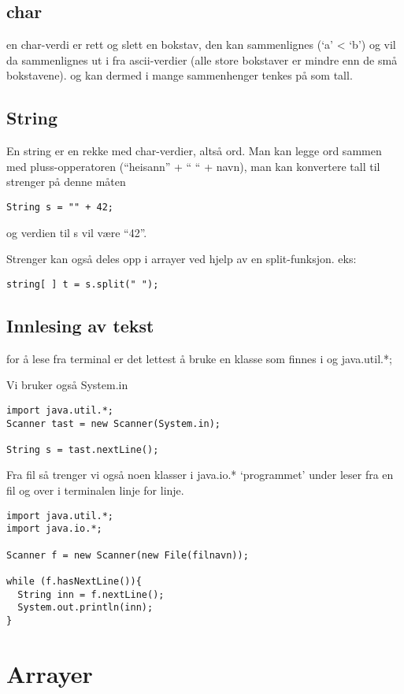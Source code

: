 \documentclass[11pt]{article}
\begin{document}
\subsection{char}
\label{sec-3_1}


   en char-verdi er rett og slett en bokstav, den kan sammenlignes (`a' < `b') 
   og vil da sammenlignes ut
   i fra ascii-verdier (alle store bokstaver er mindre enn de små bokstavene).
   og kan dermed i mange sammenhenger tenkes på som tall.
\subsection{String}
\label{sec-3_2}


   En string er en rekke med char-verdier, altså ord. Man kan legge ord
   sammen med pluss-opperatoren 
   (``heisann'' + `` `` + navn), man kan konvertere tall til strenger på denne måten
\begin{verbatim}
String s = "" + 42;
\end{verbatim}
   og verdien til s vil være ``42''.

   Strenger kan også deles opp i arrayer ved hjelp av en split-funksjon. eks:
\begin{verbatim}
string[ ] t = s.split(" ");
\end{verbatim}
\subsection{Innlesing av tekst}
\label{sec-3_3}

for å lese fra terminal er det lettest å bruke en klasse som
finnes i og java.util.*;

Vi bruker også System.in

\begin{verbatim}
import java.util.*;
Scanner tast = new Scanner(System.in);

String s = tast.nextLine();
\end{verbatim}

Fra fil så trenger vi også noen klasser i java.io.*
`programmet' under leser fra en fil og over i terminalen linje for linje.

\begin{verbatim}
import java.util.*;
import java.io.*;

Scanner f = new Scanner(new File(filnavn));

while (f.hasNextLine()){
  String inn = f.nextLine();
  System.out.println(inn);
}
\end{verbatim}
\section{Arrayer}
\label{sec-4}
\end{document}
